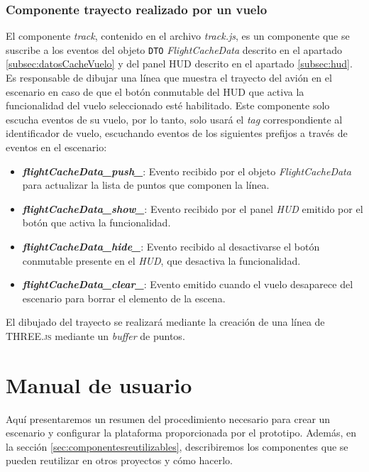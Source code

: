 \documentclass[a4paper, 11pt]{book}
\begin{document}
\subsection{Componente trayecto realizado por un vuelo}
\label{subsec:track}
El componente \emph{track}, contenido en el archivo \emph{track.js}, es un componente que se suscribe a los eventos del objeto \texttt{DTO} \emph{FlightCacheData} descrito en el apartado \ref{subsec:datosCacheVuelo} y del panel \textsc{HUD} descrito en el apartado \ref{subsec:hud}.
Es responsable de dibujar una línea que muestra el trayecto del avión en el escenario en caso de que el botón conmutable del \textsc{HUD} que activa la funcionalidad del vuelo seleccionado esté habilitado. Este componente solo escucha eventos de su vuelo, por lo tanto, solo usará el \emph{tag} correspondiente al identificador de vuelo, escuchando eventos de los siguientes prefijos a través de eventos en el escenario:
\begin{itemize}
	\item \textbf{\emph{flightCacheData\_push\_}}: Evento recibido por el objeto \emph{FlightCacheData} para actualizar la lista de puntos que componen la línea.
	\item \textbf{\emph{flightCacheData\_show\_}}: Evento recibido por el panel \emph{HUD} emitido por el botón que activa la funcionalidad.
	\item \textbf{\emph{flightCacheData\_hide\_}}: Evento recibido al desactivarse el botón conmutable presente en el \emph{HUD}, que desactiva la funcionalidad.
	\item \textbf{\emph{flightCacheData\_clear\_}}: Evento emitido cuando el vuelo desaparece del escenario para borrar el elemento de la escena.
\end{itemize}
El dibujado del trayecto se realizará mediante la creación de una línea de \textsc{THREE.js} mediante un \emph{buffer} de puntos.
\chapter{Manual de usuario}
Aquí presentaremos un resumen del procedimiento necesario para crear un escenario y configurar la plataforma proporcionada por el prototipo. Además, en la sección \ref{sec:componentesreutilizables}, describiremos los componentes que se pueden reutilizar en otros proyectos y cómo hacerlo.
\end{document}
